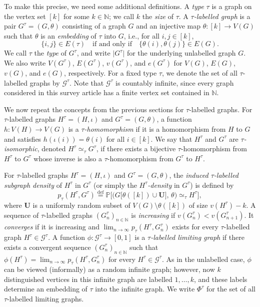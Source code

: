 \documentclass{article}
\newcommand*{\defeq}{\stackrel{\mathrm{def}}{=}}
\begin{document}
To make this precise, we need some additional definitions.
A \emph{type} $\tau$ is a graph on the vertex set $[k]$ for some $k \in \mathbb{N}$; we call $k$ the \emph{size} of $\tau$.
A \emph{$\tau$-labelled graph} is a pair $G^\tau = (G, \theta)$ consisting of a graph $G$ and an injective map $\theta : [k] \to V(G)$ such that $\theta$ is an \emph{embedding} of $\tau$ into $G$, i.e., for all $i,j \in [k]$,
\[
\{i,j\} \in E(\tau) \quad\text{if and only if}\quad \{\theta(i), \theta(j)\} \in E(G).
\]
We call $\tau$ the \emph{type} of $G^\tau$, and write $\lvert G^\tau \rvert$ for the underlying unlabelled graph $G$.
We also write $V(G^\tau)$, $E(G^\tau)$, $v(G^\tau)$, and $e(G^\tau)$ for $V(G)$, $E(G)$, $v(G)$, and $e(G)$, respectively.
For a fixed type $\tau$, we denote the set of all $\tau$-labelled graphs by $\mathcal{G}^\tau$.
Note that $\mathcal{G}^\tau$ is countably infinite, since every graph considered in this survey article has a finite vertex set contained in $\mathbb{N}$.

We now repeat the concepts from the previous sections for $\tau$-labelled graphs.
For $\tau$-labelled graphs $H^\tau = (H,\iota)$ and $G^\tau = (G,\theta)$, a function $h : V(H) \to V(G)$ is a \emph{$\tau$-homomorphism} if it is a homomorphism from $H$ to $G$ and satisfies $h(\iota(i)) = \theta(i)$ for all $i \in [k]$.
We say that $H^\tau$ and $G^\tau$ are \emph{$\tau$-isomorphic}, denoted $H^\tau \simeq_\tau G^\tau$, if there exists a bijective $\tau$-homomorphism from $H^\tau$ to $G^\tau$ whose inverse is also a $\tau$-homomorphism from $G^\tau$ to $H^\tau$.

For $\tau$-labelled graphs $H^\tau = (H,\iota)$ and $G^\tau = (G,\theta)$, the \emph{induced $\tau$-labelled subgraph density} of $H^\tau$ in $G^\tau$ (or simply the \emph{$H^\tau$-density} in $G^\tau$) is defined by
\[
p_\tau(H^\tau,G^\tau) \defeq \mathbb{P}\Big[\big(G\big[\theta([k]) \cup \mathbf{U}\big],\,\theta\big) \simeq_\tau H^\tau\Big],
\]
where $\mathbf{U}$ is a uniformly random subset of $V(G) \setminus \theta([k])$ of size $v(H^\tau) - k$.
A sequence of $\tau$-labelled graphs $(G^\tau_n)_{n \in \mathbb{N}}$ is \emph{increasing} if $v(G^\tau_n) < v(G^\tau_{n+1})$.
It \emph{converges} if it is increasing and $\lim_{n \to \infty} p_\tau(H^\tau, G^\tau_n)$ exists for every $\tau$-labelled graph $H^\tau \in \mathcal{G}^\tau$.
A function $\phi : \mathcal{G}^\tau \to [0,1]$ is a \emph{$\tau$-labelled limiting graph} if there exists a convergent sequence $(G^\tau_n)_{n \in \mathbb{N}}$ such that
$\phi(H^\tau) = \lim_{n \to \infty} p_\tau(H^\tau, G^\tau_n)$ for every $H^\tau \in \mathcal{G}^\tau$.
As in the unlabelled case, $\phi$ can be viewed (informally) as a random infinite graph; however, now $k$ distinguished vertices in this infinite graph are labelled $1,\ldots,k$, and these labels determine an embedding of $\tau$ into the infinite graph.
We write $\Phi^\tau$ for the set of all $\tau$-labelled limiting graphs.
\end{document}
